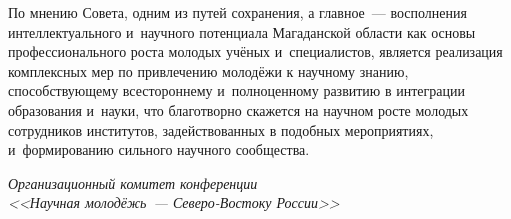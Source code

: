 По мнению Совета, одним из путей сохранения, а главное~--- восполнения интеллектуального и~научного потенциала Магаданской области как основы профессионального роста молодых учёных и~специалистов, является реализация комплексных мер по привлечению молодёжи к научному знанию, способствующему всестороннему и~полноценному развитию в интеграции образования и~науки, что благотворно скажется на научном росте молодых сотрудников институтов, задействованных в подобных мероприятиях, и~формированию сильного научного сообщества.


\begin{flushright}
\textit{Организационный комитет конференции\\
<<Научная молодёжь~--- Северо-Востоку России>>}
\end{flushright}
